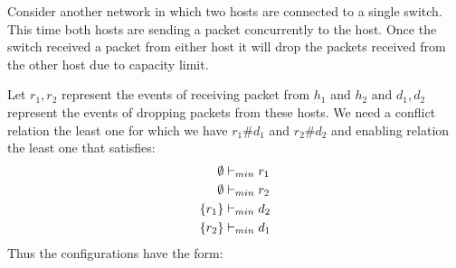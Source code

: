 \documentclass{article}
\begin{document}
\begin{example}
    Consider another network in which two hosts are connected
    to a single switch.
    This time both hosts are sending a packet concurrently to the
    host.
    Once the switch received a packet from either host it will
    drop the packets received from the other host due to capacity
    limit.
    \begin{center}
    \end{center}
    Let $r_1,r_2$ represent the events of receiving packet from
    $h_1$ and $h_2$ and $d_1,d_2$ represent the events of dropping
    packets from these hosts.
    We need a conflict relation the least one for which we have
    $r_1\#d_1$ and $r_2\#d_2$
    and enabling relation the least one that satisfies:
    \begin{align*}
        \emptyset & \vdash_{min} r_1 \\
        \emptyset & \vdash_{min} r_2 \\
        \{r_1\}   & \vdash_{min} d_2 \\
        \{r_2\}   & \vdash_{min} d_1 \\
    \end{align*}
    Thus the configurations have the form:
    \begin{center}
    \end{center}
\end{example}
\end{document}
